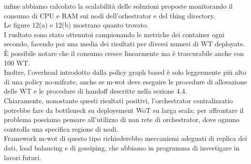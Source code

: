 \documentclass[11pt]{article}
\begin{document}
	infine abbiamo calcolato la scalabilità delle soluzioni proposte monitorando il consumo di CPU e RAM sui nodi dell'orhestrator e del thing directory. \\
	Le figure 12(a) e 12(b) mostrano quanto trovato. \\
	I rusltato sono stato ottenutoi campionando le metriche dei container ogni secondo, facendo poi una media dei risultati per diversi numeri di WT deployate. \\
	È possibile notare che il consumo cresce linearmente ma è trascurabile anche con 100 WT. \\
	Inoltre, l'overhead introdotto dalla policy graph based è solo leggermente più alto di una policy no-mifrate, anche se m-wot deve eseguire le procedure di allovazione delle WT e le procedure di handoff descritte nella sezione 4.4. \\
	Chiaramente, nonostante questi risultati positivi, l'orchestrator centralizzatio potrebbe fare da bottleneck su deployement WoT su larga scala; per affrontare il problema possiamo pensare all'utilizzo di uan rete di orchestrator, dove ognuno controlla una specifica regione di nodi. \\
	Framework m-wot di questo tipo richiederebbo meccanismi adeguati di replica dei dati, load balancing  e di gossiping, che abbiamo in programma di investigare in lavori futuri.
\end{document}
